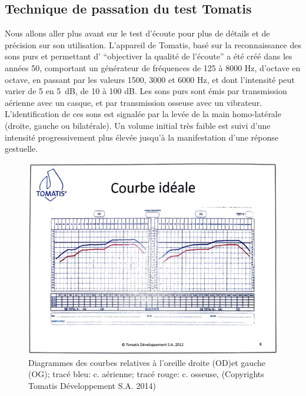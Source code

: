\subsection{Technique de passation du test Tomatis}
Nous allons aller plus avant sur le test d'écoute pour plus de détails et de précision sur son utilisation.
L'appareil de Tomatis, basé sur la reconnaissance des sons purs 
et permettant d'
\enquote{objectiver la qualité de l'écoute} \autocite [34--35]{Tomatislangage}
 a été créé dans les années 50, comportant un générateur de fréquences
  de 125 à 8000 Hz, d'octave en octave, en passant par les valeurs
1500, 3000 et 6000 Hz, et dont l'intensité peut varier de 5 en \SI{5}{\dB}, de 10 à 100 dB.
Les sons purs sont émis par 
  transmission aérienne avec un casque, et par transmission osseuse
  avec un vibrateur.
L'identification de ces sons est
  signalée par la levée de la main homo-latérale (droite, gauche ou
  bilatérale).
Un volume initial très faible est suivi d'une intensité
progressivement plus élevée jusqu'à la manifestation d'une réponse gestuelle.



\begin{figure}
	\centering
	\includegraphics[width=0.7
	\linewidth]{images/graphiques/courbeideale.png}
	\caption[Courbe idéale]{Diagrammes des courbes relatives à l'oreille droite (OD)et
          gauche (OG); tracé bleu: c. aérienne; tracé rouge: c.
          osseuse, (Copyrights Tomatis Développement S.A.  2014) }
	\label{Courbe idéale}
\end{figure}

